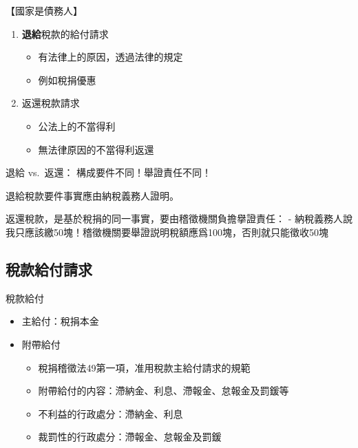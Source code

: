 \documentclass[]{ctexbook}
\providecommand{\tightlist}{%
  \setlength{\itemsep}{0pt}\setlength{\parskip}{0pt}}
\begin{document}
【國家是債務人】

\begin{enumerate}
\def\labelenumi{\arabic{enumi}.}
\setcounter{enumi}{2}
\tightlist
\item
  \textbf{退給}稅款的給付請求

  \begin{itemize}
  \tightlist
  \item
    有法律上的原因，透過法律的規定
  \item
    例如稅捐優惠
  \end{itemize}
\item
  返還稅款請求

  \begin{itemize}
  \tightlist
  \item
    公法上的不當得利
  \item
    無法律原因的不當得利返還
  \end{itemize}
\end{enumerate}

退給 vs.~返還：
構成要件不同！舉證責任不同！

退給稅款要件事實應由納稅義務人證明。

返還稅款，是基於稅捐的同一事實，要由稽徵機關負擔擧證責任：
- 納稅義務人說我只應該繳50塊！稽徵機關要舉證説明稅額應爲100塊，否則就只能徵收50塊

\hypertarget{ux7a05ux6b3eux7d66ux4ed8ux8acbux6c42}{%
\subsection{稅款給付請求}\label{ux7a05ux6b3eux7d66ux4ed8ux8acbux6c42}}

稅款給付

\begin{itemize}
\tightlist
\item
  主給付：稅捐本金
\item
  附帶給付

  \begin{itemize}
  \tightlist
  \item
    稅捐稽徵法49第一項，准用稅款主給付請求的規範
  \item
    附帶給付的内容：滯納金、利息、滯報金、怠報金及罰鍰等
  \item
    不利益的行政處分：滯納金、利息
  \item
    裁罰性的行政處分：滯報金、怠報金及罰鍰
  \end{itemize}
\end{itemize}
\end{document}
